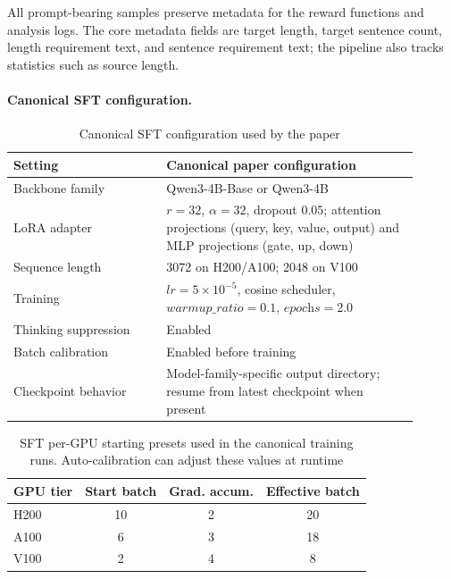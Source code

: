 \documentclass[11pt]{article}
\begin{document}
All prompt-bearing samples preserve metadata for the reward functions and analysis logs.
The core metadata fields are target length, target sentence count, length requirement text, and sentence requirement text; the pipeline also tracks statistics such as source length.

\paragraph{Canonical SFT configuration.}
\begin{table}[H]
\centering
\caption{Canonical SFT configuration used by the paper}
\label{tab:appendix-sft-config}
\small
\begin{tabular}{L{0.34\linewidth}L{0.56\linewidth}}
\toprule
Setting & Canonical paper configuration \\
\midrule
Backbone family & Qwen3-4B-Base or Qwen3-4B \\
LoRA adapter & $r = 32$, $\alpha = 32$, dropout $0.05$; attention projections (query, key, value, output) and MLP projections (gate, up, down) \\
Sequence length & $3072$ on H200/A100; $2048$ on V100 \\
Training & $\mathit{lr} = 5\times10^{-5}$, cosine scheduler, $\mathit{warmup\_ratio} = 0.1$, $\textit{epochs} = 2.0$ \\
Thinking suppression & Enabled \\
Batch calibration & Enabled before training \\
Checkpoint behavior & Model-family-specific output directory; resume from latest checkpoint when present \\
\bottomrule
\end{tabular}
\end{table}

\begin{table}[H]
\centering
\caption{SFT per-GPU starting presets used in the canonical training runs. Auto-calibration can adjust these values at runtime}
\label{tab:appendix-sft-gpu}
\small
\begin{tabular}{lccc}
\toprule
GPU tier & Start batch & Grad. accum. & Effective batch \\
\midrule
H200 & 10 & 2 & 20 \\
A100 & 6 & 3 & 18 \\
V100 & 2 & 4 & 8 \\
\bottomrule
\end{tabular}
\end{table}
\end{document}
